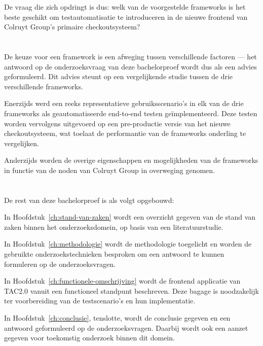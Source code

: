 De vraag die zich opdringt is dus: welk van de voorgestelde frameworks is het beste geschikt om testautomatisatie te introduceren in de nieuwe frontend van Colruyt Group's primaire checkoutsysteem?

\section{}
\label{sec:onderzoeksdoelstelling}

De keuze voor een framework is een afweging tussen verschillende factoren — het antwoord op de onderzoeksvraag van deze bachelorproef wordt dus als een advies geformuleerd. Dit advies steunt op een vergelijkende studie tussen de drie verschillende frameworks.

Enerzijds werd een reeks representatieve gebruiksscenario's in elk van de drie frameworks als geautomatiseerde end-to-end testen geïmplementeerd. Deze testen worden vervolgens uitgevoerd op een pre-productie versie van het nieuwe checkoutsysteem, wat toelaat de performantie van de frameworks onderling te vergelijken.

Anderzijds worden de overige eigenschappen en mogelijkheden van de frameworks in functie van de noden van Colruyt Group in overweging genomen.

\section{}
\label{sec:opzet-bachelorproef}


De rest van deze bachelorproef is als volgt opgebouwd:

In Hoofdstuk~\ref{ch:stand-van-zaken} wordt een overzicht gegeven van de stand van zaken binnen het onderzoeksdomein, op basis van een literatuurstudie.

In Hoofdstuk~\ref{ch:methodologie} wordt de methodologie toegelicht en worden de gebruikte onderzoekstechnieken besproken om een antwoord te kunnen formuleren op de onderzoeksvragen.

In Hoofdstuk~\ref{ch:functionele-omschrijving} wordt de frontend applicatie van TAC2.0 vanuit een functioneel standpunt beschreven. Deze bagage is noodzakelijk ter voorbereiding van de testscenario's en hun implementatie.


In Hoofdstuk~\ref{ch:conclusie}, tenslotte, wordt de conclusie gegeven en een antwoord geformuleerd op de onderzoeksvragen. Daarbij wordt ook een aanzet gegeven voor toekomstig onderzoek binnen dit domein.